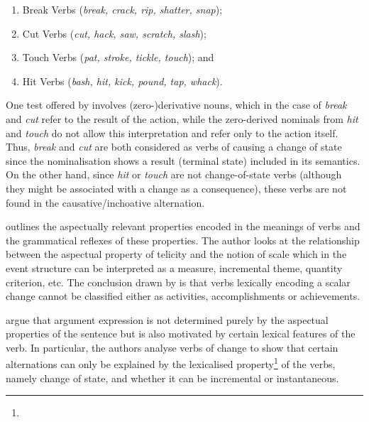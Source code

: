 \documentclass[output=paper,colorlinks,citecolor=brown]{langscibook}
\begin{document}
\begin{enumerate}[label=(\alph*)]
\item Break Verbs (\textit{break, crack, rip, shatter, snap});
\item Cut Verbs (\textit{cut, hack, saw, scratch, slash});
\item Touch Verbs (\textit{pat, stroke, tickle, touch}); and
\item Hit Verbs (\textit{bash, hit, kick, pound, tap, whack}).
\end{enumerate}

One test offered by \citet{Levin1993} involves (zero-)derivative nouns, which in the case of \textit{break} and \textit{cut} refer to the result of the action, while the zero-derived nominals from \textit{hit} and \textit{touch} do not allow this interpretation and refer only to the action itself. Thus, \textit{break} and \textit{cut} are both considered as verbs of causing a change of state since the nominalisation shows a result (terminal state) included in its semantics. On the other hand, since \textit{hit} or \textit{touch} are not change-of-state verbs (although they might be associated with a change as a consequence), these verbs are not found in the causative/inchoative alternation.

\citet[16--20]{RappaportHovav2008} outlines the aspectually relevant properties encoded in the meanings of verbs and the grammatical reflexes of these properties. The author looks at the relationship between the aspectual property of telicity and the notion of scale which in the event structure can be interpreted as a measure, incremental theme, quantity criterion, etc. The conclusion drawn by \citet{RappaportHovav2008} is that verbs lexically encoding a scalar change cannot be classified  either as activities, accomplishments or achievements.

\citet[278--279]{RappaportHovavLevin2005} argue that argument expression is not determined purely by the aspectual properties of the sentence but is also motivated by certain lexical features of the verb. In particular, the authors analyse verbs of change to show that certain alternations can only be explained by the lexicalised property\footnote{} of the verbs, namely change of state, and whether it can be incremental or instantaneous. 
\end{document}
